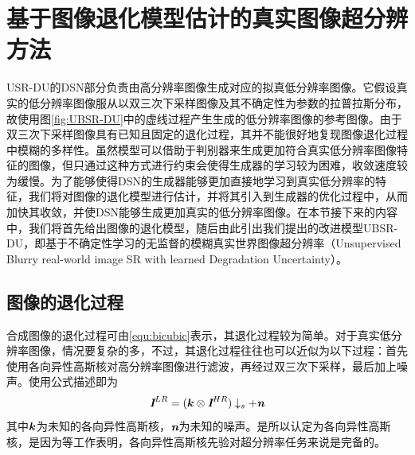 

\section{基于图像退化模型估计的真实图像超分辨方法}
USR-DU的DSN部分负责由高分辨率图像生成对应的拟真低分辨率图像。它假设真实的低分辨率图像服从以双三次下采样图像及其不确定性为参数的拉普拉斯分布，故使用图\ref{fig:UBSR-DU}中的虚线过程产生生成的低分辨率图像的参考图像。由于双三次下采样图像具有已知且固定的退化过程，其并不能很好地复现图像退化过程中模糊的多样性。虽然模型可以借助于判别器来生成更加符合真实低分辨率图像特征的图像，但只通过这种方式进行约束会使得生成器的学习较为困难，收敛速度较为缓慢。为了能够使得DSN的生成器能够更加直接地学习到真实低分辨率的特征，我们将对图像的退化模型进行估计，并将其引入到生成器的优化过程中，从而加快其收敛，并使DSN能够生成更加真实的低分辨率图像。在本节接下来的内容中，我们将首先给出图像的退化模型，随后由此引出我们提出的改进模型UBSR-DU，即基于不确定性学习的无监督的模糊真实世界图像超分辨率（Unsupervised Blurry real-world image SR with learned Degradation Uncertainty）。
\subsection{图像的退化过程}
合成图像的退化过程可由\ref{equ:bicubic}表示，其退化过程较为简单。对于真实低分辨率图像，情况要复杂的多，不过，其退化过程往往也可以近似为以下过程：首先使用各向异性高斯核对高分辨率图像进行滤波，再经过双三次下采样，最后加上噪声。使用公式描述即为
\begin{equation}
    \textbf{\em I}^{LR}=(\vb*{k}\otimes \textbf{\em I}^{HR})\downarrow_s+\textbf{\em n}
\end{equation}
其中$\vb*{k}$为未知的各向异性高斯核，$\textbf{\em n}$为未知的噪声。是所以认定为各向异性高斯核，是因为\cite{Gau_1}\cite{Gau_2}\cite{Gau_3}\cite{Gau_4}\cite{Gau_5}等工作表明，各向异性高斯核先验对超分辨率任务来说是完备的。

